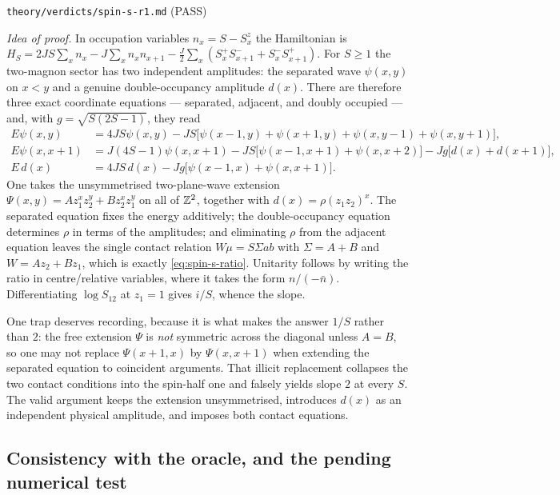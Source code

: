 %
{\texttt{theory/verdicts/spin-s-r1.md} (PASS)}

\emph{Idea of proof.} In occupation variables $n_x=S-S^z_x$ the Hamiltonian is
$H_S=2JS\sum_xn_x-J\sum_xn_xn_{x+1}-\tfrac{J}{2}\sum_x(S^+_xS^-_{x+1}+S^-_xS^+_{x+1})$.
For $S\ge1$ the two-magnon sector has two independent amplitudes: the
separated wave $\psi(x,y)$ on $x<y$ and a genuine double-occupancy amplitude
$d(x)$. There are therefore three exact coordinate equations --- separated,
adjacent, and doubly occupied --- and, with $g=\sqrt{S(2S-1)}$, they read
\begin{align}
  E\psi(x,y)&=4JS\psi(x,y)-JS\bigl[\psi(x-1,y)+\psi(x+1,y)+\psi(x,y-1)+\psi(x,y+1)\bigr],\\
  E\psi(x,x+1)&=J(4S-1)\psi(x,x+1)-JS\bigl[\psi(x-1,x+1)+\psi(x,x+2)\bigr]
    -Jg\bigl[d(x)+d(x+1)\bigr],\\
  E\,d(x)&=4JS\,d(x)-Jg\bigl[\psi(x-1,x)+\psi(x,x+1)\bigr].
\end{align}
One takes the unsymmetrised two-plane-wave extension
$\Psi(x,y)=Az_1^xz_2^y+Bz_2^xz_1^y$ on all of $\mathbb{Z}^2$, together with
$d(x)=\rho(z_1z_2)^x$. The separated equation fixes the energy additively; the
double-occupancy equation determines $\rho$ in terms of the amplitudes; and
eliminating $\rho$ from the adjacent equation leaves the single contact
relation $W\mu=S\Sigma ab$ with $\Sigma=A+B$ and $W=Az_2+Bz_1$, which is
exactly \cref{eq:spin-s-ratio}. Unitarity follows by writing the ratio in
centre/relative variables, where it takes the form $n/(-\bar n)$.
Differentiating $\log S_{12}$ at $z_1=1$ gives $i/S$, whence the slope.

One trap deserves recording, because it is what makes the answer $1/S$ rather
than $2$: the free extension $\Psi$ is \emph{not} symmetric across the
diagonal unless $A=B$, so one may not replace $\Psi(x+1,x)$ by $\Psi(x,x+1)$
when extending the separated equation to coincident arguments. That illicit
replacement collapses the two contact conditions into the spin-half one and
falsely yields slope $2$ at every $S$. The valid argument keeps the extension
unsymmetrised, introduces $d(x)$ as an independent physical amplitude, and
imposes both contact equations.

\subsection{Consistency with the oracle, and the pending numerical test}

